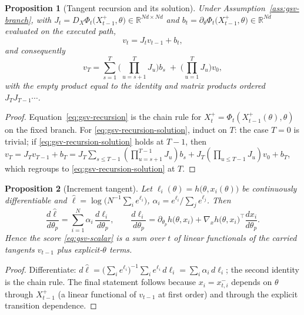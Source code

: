 \documentclass[11pt]{article}
\newtheorem{proposition}{Proposition}[section]
\theoremstyle{definition}
\theoremstyle{remark}
\begin{document}
\begin{proposition}[Tangent recursion and its solution]
\label{prop:gsv-tangent-recursion}
Under Assumption~\ref{ass:gsv-branch}, with
$J_t = D_X\Phi_t\big(X_{t-1}^{+},\theta\big)\in\mathbb{R}^{Nd\times Nd}$ and
$b_t = \partial_\theta\Phi_t\big(X_{t-1}^{+},\theta\big)\in\mathbb{R}^{Nd}$
evaluated on the executed path,
\begin{equation}
\label{eq:gsv-recursion}
 v_t = J_t v_{t-1} + b_t ,
\end{equation}
and consequently
\begin{equation}
\label{eq:gsv-recursion-solution}
 v_T=\sum_{s=1}^{T}\Big(\prod_{u=s+1}^{T}J_u\Big) b_s
 \;+\;\Big(\prod_{u=1}^{T}J_u\Big) v_0 ,
\end{equation}
with the empty product equal to the identity and matrix products ordered
$J_T J_{T-1}\cdots$.
\end{proposition}

\begin{proof}
Equation~\eqref{eq:gsv-recursion} is the chain rule for
$X_t^{+}=\Phi_t(X_{t-1}^{+}(\theta),\theta)$ on the fixed branch.  For
\eqref{eq:gsv-recursion-solution}, induct on $T$: the case $T=0$ is trivial;
if \eqref{eq:gsv-recursion-solution} holds at $T-1$, then
$v_T=J_T v_{T-1}+b_T
=J_T\sum_{s\le T-1}(\prod_{u=s+1}^{T-1}J_u)b_s
+J_T(\prod_{u\le T-1}J_u)v_0+b_T$,
which regroups to \eqref{eq:gsv-recursion-solution} at $T$.
\end{proof}

\begin{proposition}[Increment tangent]
\label{prop:gsv-increment-tangent}
Let $\ell_i(\theta)=h\big(\theta,x_i(\theta)\big)$ be continuously
differentiable and
$\widehat\ell=\log\big(N^{-1}\sum_i e^{\ell_i}\big)$,
$\alpha_i=e^{\ell_i}/\sum_j e^{\ell_j}$.  Then
\begin{equation}
\label{eq:gsv-increment-tangent}
 \frac{d\widehat\ell}{d\theta_p}
 =\sum_{i=1}^N \alpha_i\,\frac{d\ell_i}{d\theta_p},
 \qquad
 \frac{d\ell_i}{d\theta_p}
 =\partial_{\theta_p} h\big(\theta,x_i\big)
 +\nabla_x h\big(\theta,x_i\big)^{\!\top}\frac{dx_i}{d\theta_p}.
\end{equation}
Hence the score \eqref{eq:gsv-scalar} is a sum over $t$ of linear functionals
of the carried tangents $v_{t-1}$ plus explicit-$\theta$ terms.
\end{proposition}

\begin{proof}
Differentiate: $d\widehat\ell
=\big(\sum_i e^{\ell_i}\big)^{-1}\sum_i e^{\ell_i}\,d\ell_i
=\sum_i\alpha_i\,d\ell_i$; the second identity is the chain rule.  The final
statement follows because $x_i=x_{t,i}^{-}$ depends on $\theta$ through
$X_{t-1}^{+}$ (a linear functional of $v_{t-1}$ at first order) and through
the explicit transition dependence.
\end{proof}
\end{document}
